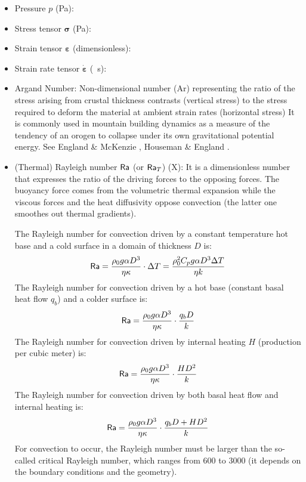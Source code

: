 \begin{itemize}
\item {\color{violet} Pressure} $p$ (\si{\pascal}):
\item {\color{violet} Stress tensor} ${\bm \sigma}$ (\si{\pascal}): 
\item {\color{violet} Strain tensor} ${\bm \varepsilon}$ (dimensionless): 
\item {\color{violet} Strain rate tensor} $ \dot{\bm \varepsilon}$ (\si{\per\second}): 

\item {\color{violet} Argand Number}: 
Non-dimensional number (Ar) representing the ratio of the stress arising 
from crustal thickness
contrasts (vertical stress) to the stress required to deform
the material at ambient strain rates (horizontal stress)
It is commonly used in mountain building
dynamics as a measure of the tendency of an orogen to
collapse under its own gravitational potential energy.
See England \& McKenzie \cite{enmc82}, Houseman \& England \cite{hoen86a}.

\item {\color{violet} (Thermal) Rayleigh number} ${\mathsf{Ra}}$ (or ${\mathsf{Ra}}_T$) (X): 
It is a dimensionless number that expresses the	ratio of the driving forces to the opposing forces.
The buoyancy force comes from the volumetric thermal expansion while the viscous forces and 
the heat diffusivity oppose convection (the latter one smoothes out thermal gradients). 

The Rayleigh number for convection driven by a constant temperature hot base and a cold surface
in a domain of thickness $D$ is:
\[
{\mathsf{Ra}} 
= \frac{\rho_0 g \alpha D^3 }{\eta \kappa}  \cdot  \Delta T
= \frac{\rho_0^2 C_p g \alpha D^3 \Delta T}{\eta k}
\]
The Rayleigh number for convection driven by a hot base (constant basal heat flow $q_b$)
and a colder surface is:
\[
{\mathsf{Ra}} = \frac{\rho_0 g \alpha D^3}{\eta \kappa } \cdot  \frac{q_b D}{k}
\]  
The Rayleigh number for convection driven by internal heating $H$ (production per cubic meter) is:
\[
{\mathsf{Ra}} = \frac{\rho_0 g \alpha D^3}{\eta \kappa} \cdot  \frac{H D^2}{k }
\]
The Rayleigh number for convection driven by both basal heat flow and internal heating is:	
\[
{\mathsf{Ra}} = \frac{\rho_0 g \alpha D^3}{\eta \kappa} \cdot  \frac{q_b D + H D^2}{k }
\]
For convection to occur, the Rayleigh number must be larger than the so-called critical 
Rayleigh number, which ranges from 600 to 3000 (it depends on the boundary conditions and the 
geometry).


\end{itemize}
